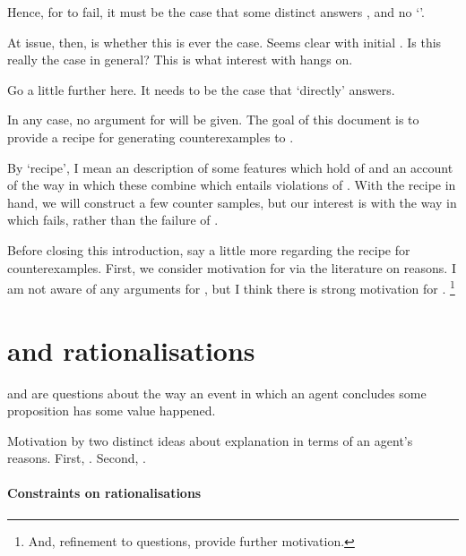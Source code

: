 \begin{note}
{    Hence, for \issueInclusion{} to fail, it must be the case that some distinct \ros{} answers \qWhy{}, and no `\wit{}'.

    At issue, then, is whether this is ever the case.
    Seems clear with initial .
    Is this really the case in general?
    This is what interest with \issueInclusion{} hangs on.

    Go a little further here.
    It needs to be the case that \ros{} `directly' answers.
  }

  In any case, no argument for \issueInclusion{} will be given.
  The goal of this document is to provide a recipe for generating counterexamples to \issueInclusion{}.

  By `recipe', I mean an description of some features which hold of  and an account of the way in which these combine which entails violations of \issueInclusion{}.
  With the recipe in hand, we will construct a few counter samples, but our interest is with the way in which \issueInclusion{} fails, rather than the failure of \issueInclusion{}.

  Before closing this introduction, say a little more regarding the recipe for counterexamples.
  First, we consider motivation for \issueInclusion{} via the literature on reasons.
  I am not aware of any arguments for \issueInclusion{}, but I think there is strong motivation for \issueInclusion{}.%
  \footnote{
    \color{red}
    And, refinement to questions, provide further motivation.
  }
\end{note}

\section*{\issueInclusion{} and rationalisations}
\label{sec:reasons}

\begin{note}
  \qWhy{} and \qHow{} are questions about the way an event in which an agent concludes some proposition has some value happened.
\end{note}

\begin{note}
  Motivation by two distinct ideas about explanation in terms of an agent's reasons.
  First, .
  Second, .
\end{note}

\paragraph*{Constraints on rationalisations}


